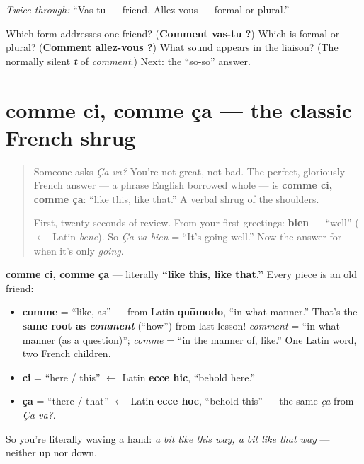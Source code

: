 \emph{Twice through:} “Vas-tu — friend. Allez-vous — formal or plural.”

\begin{tcolorbox}[breakable,colback=teal!4,colframe=teal!35!black,title={Before you move on}]
Which form addresses one friend? (\textbf{Comment vas-tu ?}) Which is formal or plural? (\textbf{Comment allez-vous ?}) What sound appears in the liaison? (The normally silent \emph{\textbf{t}} of \emph{comment}.) Next: the “so-so” answer.
\end{tcolorbox}
\section[comme ci, comme ça]{comme ci, comme ça — the classic French shrug}

\label{lesson:FR-C03-comme-ci-comme-ca}



\begin{quote}
Someone asks \emph{Ça va?} You're not great, not bad. The perfect, gloriously French answer — a phrase English borrowed whole — is \textbf{comme ci, comme ça}: \textquotedblleft{}like this, like that.\textquotedblright{} A verbal shrug of the shoulders.

First, twenty seconds of review. From your first greetings: \textbf{bien} — \textquotedblleft{}well\textquotedblright{} ($\leftarrow$ Latin \emph{bene}). So \emph{Ça va bien} = \textquotedblleft{}It's going well.\textquotedblright{} Now the answer for when it's only \emph{going}.
\end{quote}

\begin{cousinweb}
\textbf{comme ci, comme ça} — literally \textbf{\textquotedblleft{}like this, like that.\textquotedblright{}} Every piece is an old friend:

\begin{itemize}
\raggedright
  \item \textbf{comme} = \textquotedblleft{}like, as\textquotedblright{} — from Latin \textbf{quōmodo}, \textquotedblleft{}in what manner.\textquotedblright{} That's the \textbf{same root as \emph{comment}} (\textquotedblleft{}how\textquotedblright{}) from last lesson! \emph{comment} = \textquotedblleft{}in what manner (as a question)\textquotedblright{}; \emph{comme} = \textquotedblleft{}in the manner of, like.\textquotedblright{} One Latin word, two French children.
  \item \textbf{ci} = \textquotedblleft{}here / this\textquotedblright{} $\leftarrow$ Latin \textbf{ecce hic}, \textquotedblleft{}behold here.\textquotedblright{}
  \item \textbf{ça} = \textquotedblleft{}there / that\textquotedblright{} $\leftarrow$ Latin \textbf{ecce hoc}, \textquotedblleft{}behold this\textquotedblright{} — the same \emph{ça} from \emph{Ça va?}.
\end{itemize}

So you're literally waving a hand: \emph{a bit like this way, a bit like that way} — neither up nor down.
\end{cousinweb}

